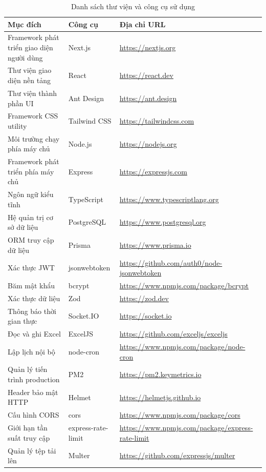 \documentclass[../DoAn.tex]{subfiles}
\begin{document}
\begin{table}[H]
\centering
\footnotesize
\begin{tabular}{|p{5.3cm}|p{2.8cm}|p{4.6cm}|}
\hline
\textbf{Mục đích} & \textbf{Công cụ} & \textbf{Địa chỉ URL} \\ \hline
Framework phát triển giao diện người dùng & Next.js & \url{https://nextjs.org} \\ \hline
Thư viện giao diện nền tảng & React & \url{https://react.dev} \\ \hline
Thư viện thành phần UI & Ant Design & \url{https://ant.design} \\ \hline
Framework CSS utility & Tailwind CSS & \url{https://tailwindcss.com} \\ \hline
Môi trường chạy phía máy chủ & Node.js & \url{https://nodejs.org} \\ \hline
Framework phát triển phía máy chủ & Express & \url{https://expressjs.com} \\ \hline
Ngôn ngữ kiểu tĩnh & TypeScript & \url{https://www.typescriptlang.org} \\ \hline
Hệ quản trị cơ sở dữ liệu & PostgreSQL & \url{https://www.postgresql.org} \\ \hline
ORM truy cập dữ liệu & Prisma & \url{https://www.prisma.io} \\ \hline
Xác thực JWT & jsonwebtoken & \url{https://github.com/auth0/node-jsonwebtoken} \\ \hline
Băm mật khẩu & bcrypt & \url{https://www.npmjs.com/package/bcrypt} \\ \hline
Xác thực dữ liệu & Zod & \url{https://zod.dev} \\ \hline
Thông báo thời gian thực & Socket.IO & \url{https://socket.io} \\ \hline
Đọc và ghi Excel & ExcelJS & \url{https://github.com/exceljs/exceljs} \\ \hline
Lập lịch nội bộ & node-cron & \url{https://www.npmjs.com/package/node-cron} \\ \hline
Quản lý tiến trình production & PM2 & \url{https://pm2.keymetrics.io} \\ \hline
Header bảo mật HTTP & Helmet & \url{https://helmetjs.github.io} \\ \hline
Cấu hình CORS & cors & \url{https://www.npmjs.com/package/cors} \\ \hline
Giới hạn tần suất truy cập & express-rate-limit & \url{https://www.npmjs.com/package/express-rate-limit} \\ \hline
Quản lý tệp tải lên & Multer & \url{https://github.com/expressjs/multer} \\ \hline
\end{tabular}
\caption{Danh sách thư viện và công cụ sử dụng}
\label{tab:thuvien}
\end{table}
\end{document}
